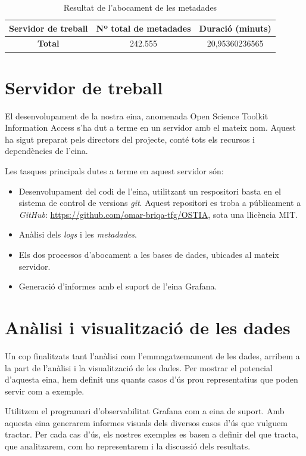 \documentclass[lettersize,journal]{IEEEtran}
\begin{document}
\begin{table}[!t]
    \caption{Resultat de l'abocament de les metadades\label{tab:table3}}
    \centering
    \begin{tabular}{|c|c|c|}
        \hline
        Servidor de treball & Nº total de metadades & Duració (minuts)\\
        \hline
        \textbf{Total} & 242.555 & 20,95360236565\\
        \hline
    \end{tabular}
\end{table}

\section{Servidor de treball}\label{sec:server-ostia}
El desenvolupament de la nostra eina, anomenada Open Science Toolkit Information Access s'ha dut a terme en un servidor amb el mateix nom.
Aquest ha sigut preparat pels directors del projecte, conté tots els recursos i dependències de l'eina.

Les tasques principals dutes a terme en aquest servidor són:
\begin{itemize}
    \item Desenvolupament del codi de l'eina, utilitzant un respositori basta en el sistema de control de versions \textit{git}.
    Aquest repositori es troba a públicament a \textit{GitHub}: \url{https://github.com/omar-briqa-tfg/OSTIA}, sota una llicència MIT.
    \item Anàlisi dels \textit{logs} i les \textit{metadades}.
    \item Els dos processos d'abocament a les bases de dades, ubicades al mateix servidor.
    \item Generació d'informes amb el suport de l'eina Grafana.
\end{itemize}


\section{Anàlisi i visualització de les dades}\label{sec:data-visualization}
Un cop finalitzats tant l'anàlisi com l'emmagatzemament de les dades, arribem a la part de l'anàlisi i la visualització de les dades.
Per mostrar el potencial d'aquesta eina, hem definit uns quants casos d'ús prou representatius que poden servir com a exemple.

Utilitzem el programari d'observabilitat Grafana com a eina de suport.
Amb aquesta eina generarem informes visuals dels diversos casos d'ús que vulguem tractar.
Per cada cas d'ús, els nostres exemples es basen a definir del que tracta, que analitzarem, com ho representarem i la discussió dels resultats.
\end{document}
